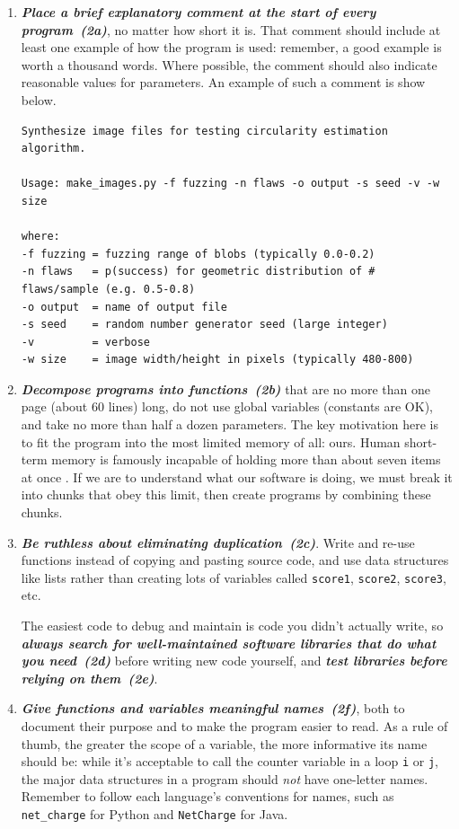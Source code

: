 \documentclass[10pt,letterpaper]{article}
\newcommand{\practice}[2]{\textbf{\emph{{#2}~({#1})}}}
\begin{document}
\begin{enumerate}

\item
  \practice{2a}{Place a brief explanatory comment at the start of every
    program}, no matter how short it is. That comment should include
  at least one example of how the program is used: remember, a good
  example is worth a thousand words. Where possible, the comment
  should also indicate reasonable values for parameters.
  An example of such a comment is show below.

{\small
\begin{verbatim}
Synthesize image files for testing circularity estimation algorithm.

Usage: make_images.py -f fuzzing -n flaws -o output -s seed -v -w size

where:
-f fuzzing = fuzzing range of blobs (typically 0.0-0.2)
-n flaws   = p(success) for geometric distribution of # flaws/sample (e.g. 0.5-0.8)
-o output  = name of output file
-s seed    = random number generator seed (large integer)
-v         = verbose
-w size    = image width/height in pixels (typically 480-800)
\end{verbatim}
}

\item
  \practice{2b}{Decompose programs into functions} that are no more than
  one page (about 60 lines) long, do not
  use global variables (constants are OK), and take no more than half
  a dozen parameters.  The key motivation here is to fit the program
  into the most limited memory of all: ours. Human short-term memory
  is famously incapable of holding more than about seven items at
  once \cite{miller1956}. If we are to understand
  what our software is doing, we must break it into chunks that obey
  this limit, then create programs by combining these chunks.

\item
  \practice{2c}{Be ruthless about eliminating duplication}. Write and
  re-use functions instead of copying and pasting source code, and use
  data structures like lists rather than creating lots of variables
  called \texttt{score1}, \texttt{score2}, \texttt{score3}, etc.

  The easiest code to debug and maintain is code you didn't
  actually write, so \practice{2d}{always search for well-maintained
  software libraries that do what you need} before writing new code yourself,
  and \practice{2e}{test libraries before relying on them}.

\item
  \practice{2f}{Give functions and variables meaningful names}, both to
  document their purpose and to make the program easier to read. As a
  rule of thumb, the greater the scope of a variable, the more
  informative its name should be: while it's acceptable to call the
  counter variable in a loop \texttt{i} or \texttt{j}, the major data
  structures in a program should \emph{not} have one-letter names. Remember to follow each language's conventions for names, such as
  \texttt{net_charge} for Python and \texttt{NetCharge} for Java.


\end{enumerate}
\end{document}
